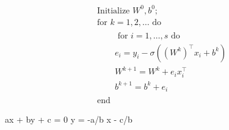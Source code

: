 \begin{align}
& \text { Initialize } W^0, b^0 \text {; } \\
& \text { for } k=1,2, \ldots \text { do } \\
& \qquad \begin{array}{|l}
\text { for } i=1, \ldots, s \text { do } \\
e_i=y_i-\sigma\left(\left(W^k\right)^{\top} x_i+b^k\right) \\
W^{k+1}=W^k+e_i x_i^{\top} \\
b^{k+1}=b^k+e_i
\end{array} \\
& \text { end }
\end{align}





ax + by + c = 0  
y = -a/b x - c/b



